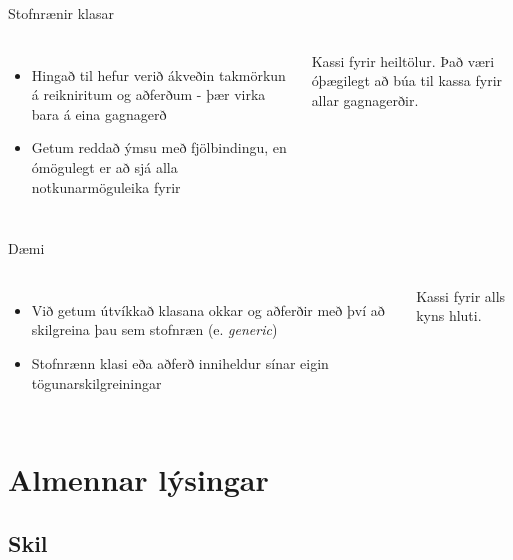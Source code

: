 \documentclass{beamer}
\begin{document}
\begin{frame}{Stofnrænir klasar}
\begin{columns}
\begin{itemize}
 \item Hingað til hefur verið ákveðin takmörkun á reikniritum og aðferðum - þær virka bara á eina gagnagerð
 \item Getum reddað ýmsu með fjölbindingu, en ómögulegt er að sjá alla notkunarmöguleika fyrir 
\end{itemize}
\begin{center}

Kassi fyrir heiltölur. Það væri óþægilegt að búa til kassa fyrir allar gagnagerðir.
\end{center}
\end{columns}
\end{frame}

\begin{frame}{Dæmi}
\begin{columns}
\begin{itemize}
 \item Við getum útvíkkað klasana okkar og aðferðir með því að skilgreina þau sem stofnræn (e. \emph{generic})
 \item Stofnrænn klasi eða aðferð inniheldur sínar eigin tögunarskilgreiningar
\end{itemize}
\begin{center}

Kassi fyrir alls kyns hluti.
\end{center}
\end{columns}
\end{frame}

\section{Almennar lýsingar}

\subsection{Skil}
\end{document}
